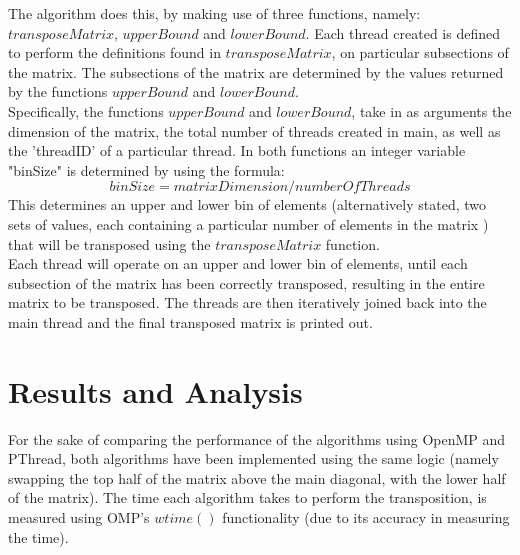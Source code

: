 \documentclass[journal, a4paper]{IEEEtran}
\begin{document}
The algorithm does this, by making use of three functions, namely: $transposeMatrix$, $upperBound$ and $lowerBound$. Each thread created is defined to perform the definitions found in $transposeMatrix$, on particular subsections of the matrix. The subsections of the matrix are determined by the values returned by the functions $upperBound$ and $lowerBound$.\\

Specifically, the functions $upperBound$ and $lowerBound$, take in as arguments the dimension of the matrix, the total number of threads created in main, as well as the 'threadID' of a particular thread. In both functions an integer variable "binSize" is determined by using the formula: \[binSize=matrixDimension/numberOfThreads\] This determines an upper and lower bin of elements (alternatively stated, two sets of values, each containing a particular number of elements in the matrix ) that will be transposed using the $transposeMatrix$ function.\\ 

Each thread will operate on an upper and lower bin of elements, until each subsection of the matrix has been correctly transposed, resulting in the entire matrix to be transposed. The threads are then iteratively joined back into the main thread and the final transposed matrix is printed out.  


\section{Results and Analysis}



For the sake of comparing the performance of the algorithms using OpenMP and PThread, both algorithms have been implemented using the same logic (namely swapping the top half of the matrix above the main diagonal, with the lower half of the matrix). The time each algorithm takes to perform the transposition, is measured using OMP’s $wtime( )$ functionality (due to its accuracy in measuring the time). \\
\end{document}
